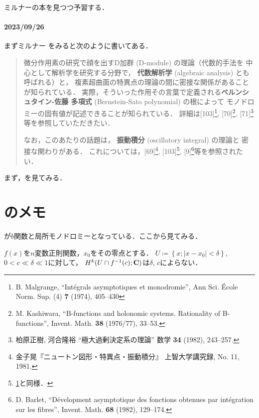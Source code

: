 ミルナーの本を見つつ予習する．

\paragraph{2023/09/26}
まずミルナー
\cite[日本語版のための解説 3.14]{M03}をみると次のように書いてある．
\begin{quotation}
    微分作用素の研究で顔を出すD加群 (D-module) の理論（代数的手法を
    中心として解析学を研究する分野で，
    \textbf{代数解析学} (algebraic analysis) とも呼ばれる）と，
    複素超曲面の特異点の理論の間に密接な関係があることが知られている．
    実際，そういった作用その言葉で定義される\textbf{ベルンシュタイン-佐藤
    多項式} (Bernstein-Sato polynomial) の根によって
    モノドロミーの固有値が記述できることが知られている．
    詳細は[103]\footnote{
        B. Malgrange, 
        ``Int\'egrals asymptotiques et monodromie'', 
        Ann Sci. \'Ecole Norm. Sup. (4) \textbf{7} (1974), 
        405--430\label{paper103}
    }, [70]\footnote{
            M. Kashiwara, 
            ``B-functions and holonomic systems. 
            Rationality of B-functions'', 
            Invent. Math. \textbf{38} (1976/77), 33--53.
    }, [71]\footnote{
            柏原正樹, 河合隆裕 
            ``極大過剰決定系の理論'' 
            数学 \textbf{34} (1982), 243--257.
    }等を参照していただきたい．

    なお，このあたりの話題は，
    \textbf{振動積分} (oscillatory integral) の理論と
    密接な関わりがある．
    これについては，[69]\footnote{
        金子晃『ニュートン図形・特異点・振動積分』
        上智大学講究録, No. 11, 1981.
    }, [103]\footnote{
        \ref{paper103}と同様．
    }, [9]\footnote{
        D. Barlet, 
        ``D\'evelopment asymptotique des fonctions obtenues 
        par int\'egration sur les fibres'', 
        Invent. Math. \textbf{68} (1982), 129--174.
    }等を参照されたい．
\end{quotation}

まず，\cite{KK82}を見てみる．

\section{\cite{KK82}のメモ}
\cite[\S6応用]{KK82}
が$b$関数と局所モノドロミーとなっている．ここから見てみる．

\(f(x)\)を\(n\)変数正則関数，\(x_0\)をその零点とする．
\(U\coloneqq\left\{x;\lvert x-x_0\rvert<\delta\right\}\), 
\(0<c\ll \delta\ll1\)に対して，
\(H^k(U\cap f^{-1}(c); \mathbf{C})\)は\(\delta\), \(c\)によらない．





